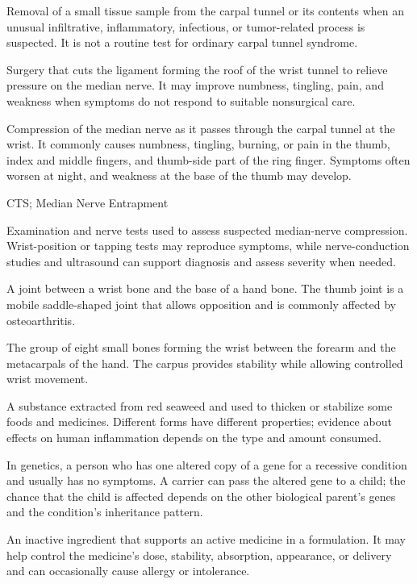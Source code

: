  Removal of a small tissue sample from the carpal tunnel or its contents when an unusual infiltrative, inflammatory, infectious, or tumor-related process is suspected. It is not a routine test for ordinary carpal tunnel syndrome.

 Surgery that cuts the ligament forming the roof of the wrist tunnel to relieve pressure on the median nerve. It may improve numbness, tingling, pain, and weakness when symptoms do not respond to suitable nonsurgical care.

 Compression of the median nerve as it passes through the carpal tunnel at the wrist. It commonly causes numbness, tingling, burning, or pain in the thumb, index and middle fingers, and thumb-side part of the ring finger. Symptoms often worsen at night, and weakness at the base of the thumb may develop.

\synonyms
CTS; Median Nerve Entrapment

 Examination and nerve tests used to assess suspected median-nerve compression. Wrist-position or tapping tests may reproduce symptoms, while nerve-conduction studies and ultrasound can support diagnosis and assess severity when needed.

 A joint between a wrist bone and the base of a hand bone. The thumb joint is a mobile saddle-shaped joint that allows opposition and is commonly affected by osteoarthritis.

 The group of eight small bones forming the wrist between the forearm and the metacarpals of the hand. The carpus provides stability while allowing controlled wrist movement.

 A substance extracted from red seaweed and used to thicken or stabilize some foods and medicines. Different forms have different properties; evidence about effects on human inflammation depends on the type and amount consumed.

 In genetics, a person who has one altered copy of a gene for a recessive condition and usually has no symptoms. A carrier can pass the altered gene to a child; the chance that the child is affected depends on the other biological parent's genes and the condition's inheritance pattern.

 An inactive ingredient that supports an active medicine in a formulation. It may help control the medicine's dose, stability, absorption, appearance, or delivery and can occasionally cause allergy or intolerance.


